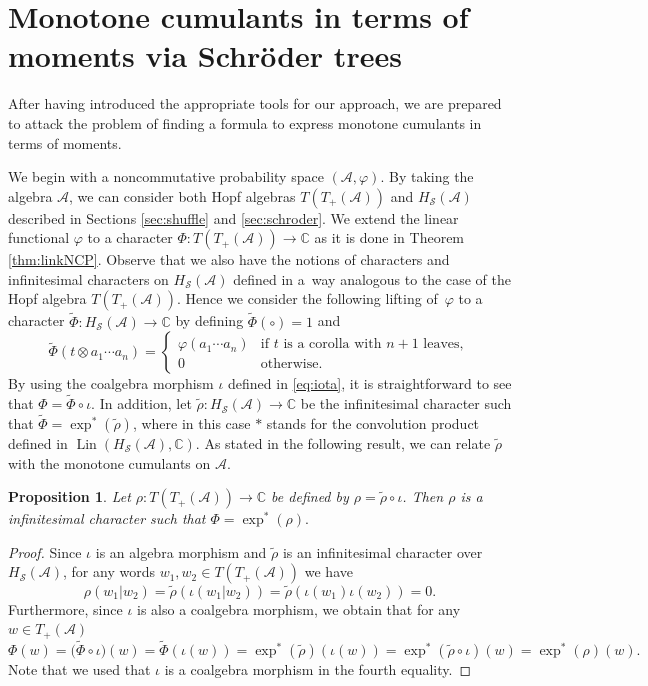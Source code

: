 \documentclass[11pt]{article}
\numberwithin{equation}{section}
\numberwithin{equation}{section}
\newtheorem{Proposition}[Theorem]{Proposition}
 { \theoremstyle{definition}
\newtheorem{Definition}[Theorem]{Definition}
\newtheorem{Example}[Theorem]{Example}
\newtheorem{Remark}[Theorem]{Remark} }
\newcommand{\A}{\mathcal{A}}
\newcommand{\cHS}{H_\mathcal{S}}
\begin{document}
\section{Monotone cumulants in terms of moments via Schr\"oder trees}\label{sec:monotone}

After having introduced the appropriate tools for our approach, we are prepared to attack the problem of finding a formula to express monotone cumulants in terms of moments.

 We begin with a noncommutative probability space $(\A,\varphi)$. By taking the algebra $\A$, we can consider both Hopf algebras $T(T_+(\A))$ and $\cHS(\A)$ described in Sections \ref{sec:shuffle} and \ref{sec:schroder}. We extend the linear functional $\varphi$ to a character $\Phi\colon T(T_+(\A))\to\mathbb{C}$ as it is done in Theorem \ref{thm:linkNCP}. Observe that we also have the notions of characters and infinitesimal characters on $\cHS(\A)$ defined in a~way analogous to the case of the Hopf algebra $T(T_+(\A))$. Hence we consider the following lifting of~$\varphi$ to a character $\tilde\Phi\colon \cHS(\A)\to\mathbb{C}$ by defining $\tilde\Phi(\circ) =1$ and
\begin{equation}
\label{eq:tildephi}
	\tilde\Phi(t \otimes a_1\cdots a_n)
	= \begin{cases} \varphi(a_1\cdots a_n) & \text{if $t$ is a corolla with $n+1$ leaves},\\ 0& \text{otherwise}. \end{cases}
\end{equation}
By using the coalgebra morphism $\iota$ defined in \eqref{eq:iota}, it is straightforward to see that $\Phi = \tilde\Phi \circ \iota.$ In addition, let $\tilde \rho\colon \cHS(\A)\to\mathbb{C}$ be the infinitesimal character such that $\tilde\Phi = \exp^*(\tilde\rho)$, where in this case $*$ stands for the convolution product defined in $\operatorname{Lin}(\cHS(\A),\mathbb{C})$. As stated in the following result, we can relate $\tilde\rho$ with the monotone cumulants on $\A$.

\begin{Proposition}\label{prop:easy}
Let $\rho\colon T(T_+(\A))\to\mathbb{C}$ be defined by $\rho = \tilde\rho\circ\iota$. Then $\rho$ is a infinitesimal character such that $\Phi = \exp^*(\rho).$
\end{Proposition}

\begin{proof}Since $\iota$ is an algebra morphism and $\tilde\rho$ is an infinitesimal character over $\cHS(\A)$, for any words $w_1,w_2\in T(T_+(\A))$ we have
\[
	\rho(w_1|w_2) = \tilde\rho(\iota(w_1|w_2)) = \tilde\rho(\iota(w_1)\iota(w_2)) = 0.
\]
Furthermore, since $\iota$ is also a coalgebra morphism, we obtain that for any $w\in T_+(\A)$
\[
	\Phi(w) = \big(\tilde\Phi \circ\iota\big)(w)
	= \tilde\Phi(\iota(w))
	= \exp^*(\tilde \rho)(\iota(w)) = \exp^*(\tilde\rho\circ\iota)(w)
	= \exp^*(\rho)(w).
\]
Note that we used that $\iota$ is a coalgebra morphism in the fourth equality.
\end{proof}
\end{document}
